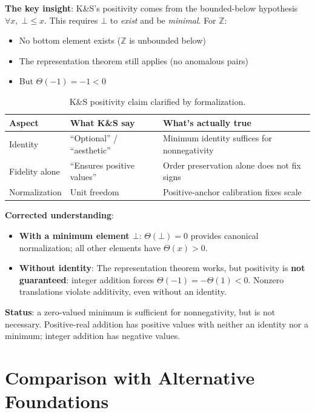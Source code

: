 \documentclass[11pt]{article}
\begin{document}
\textbf{The key insight}: K\&S's positivity comes from the bounded-below hypothesis
$\forall x,\; \bot \leq x$.
This requires $\bot$ to \emph{exist} and be \emph{minimal}. For $\mathbb{Z}$:
\begin{itemize}[noitemsep]
\item No bottom element exists ($\mathbb{Z}$ is unbounded below)
\item The representation theorem still applies (no anomalous pairs)
\item But $\Theta(-1) = -1 < 0$
\end{itemize}

\begin{table}[h]
\centering
\small
\begin{tabular}{lll}
\toprule
\textbf{Aspect} & \textbf{What K\&S say} & \textbf{What's actually true} \\
\midrule
Identity & ``Optional'' / ``aesthetic'' & Minimum identity suffices for nonnegativity \\
Fidelity alone & ``Ensures positive values'' & Order preservation alone does not fix signs \\
Normalization & Unit freedom & Positive-anchor calibration fixes scale \\
\bottomrule
\end{tabular}
\caption{K\&S positivity claim clarified by formalization.}
\end{table}

\textbf{Corrected understanding}:
\begin{itemize}[noitemsep]
\item \textbf{With a minimum element $\bot$}: $\Theta(\bot) = 0$ provides canonical
      normalization; all other elements have $\Theta(x) > 0$.
\item \textbf{Without identity}: The representation theorem works, but positivity is
      \textbf{not guaranteed}: integer addition forces $\Theta(-1)=-\Theta(1)<0$.
      Nonzero translations violate additivity, even without an identity.
\end{itemize}

\textbf{Status}: a zero-valued minimum is sufficient for nonnegativity, but is not necessary.
Positive-real addition has positive values with neither an identity nor a minimum; integer addition has negative values.

\section{Comparison with Alternative Foundations}
\end{document}
